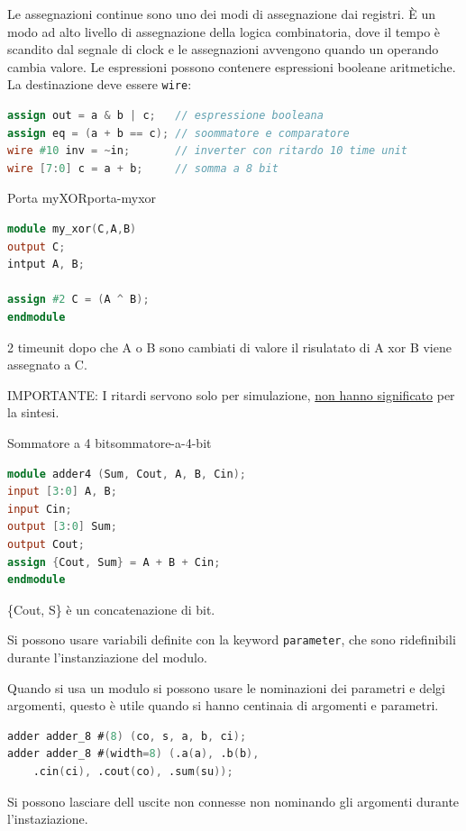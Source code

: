 \documentclass[12pt]{article}
\begin{document}
Le assegnazioni continue sono uno dei modi di assegnazione dai registri. \`E un modo ad alto livello di assegnazione della logica combinatoria, dove il tempo \`e scandito dal segnale di clock e le assegnazioni avvengono quando un operando cambia valore. Le espressioni possono contenere espressioni booleane aritmetiche. La destinazione deve essere \texttt{wire}:
\begin{lstlisting}[language=verilog]
assign out = a & b | c;   // espressione booleana
assign eq = (a + b == c); // soommatore e comparatore
wire #10 inv = ~in;       // inverter con ritardo 10 time unit
wire [7:0] c = a + b;     // somma a 8 bit
\end{lstlisting}

\begin{example}{Porta myXOR}{porta-myxor}
\begin{lstlisting}[language=verilog]
module my_xor(C,A,B)
output C;
intput A, B;

assign #2 C = (A ^ B);
endmodule
\end{lstlisting}
    2 timeunit dopo che A o B sono cambiati di valore il risulatato di A xor B viene assegnato a C.

    IMPORTANTE: I ritardi servono solo per simulazione, \underline{non hanno significato} per la sintesi.
\end{example}


\begin{example}{Sommatore a 4 bit}{sommatore-a-4-bit}
\begin{lstlisting}[language=verilog]
module adder4 (Sum, Cout, A, B, Cin);
input [3:0] A, B;
input Cin;
output [3:0] Sum;
output Cout;
assign {Cout, Sum} = A + B + Cin;
endmodule
\end{lstlisting}
    \{Cout, S\} \`e un concatenazione di bit.
\end{example}

Si possono usare variabili definite con la keyword \texttt{parameter}, che sono ridefinibili durante l'instanziazione del modulo.

Quando si usa un modulo si possono usare le nominazioni dei parametri e delgi argomenti, questo \`e utile quando si hanno centinaia di argomenti e parametri.
\begin{lstlisting}[language=verilog]
adder adder_8 #(8) (co, s, a, b, ci);
adder adder_8 #(width=8) (.a(a), .b(b),
    .cin(ci), .cout(co), .sum(su));
\end{lstlisting}

Si possono lasciare dell uscite non connesse non nominando gli argomenti durante l'instaziazione.
\end{document}
